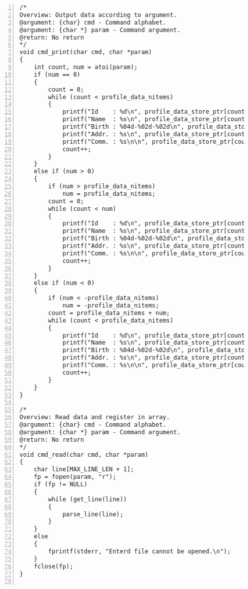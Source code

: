 \documentclass[autodetect-engine,dvi=dvipdfmx,ja=standard,
               a4j,11pt]{bxjsarticle}
\begin{document}
\begin{Verbatim}[numbers=left, xleftmargin=10mm, numbersep=6pt,
    fontsize=\small, baselinestretch=0.8]
/*
Overview: Output data according to argument.
@argument: {char} cmd - Command alphabet.
@argument: {char *} param - Command argument.
@return: No return
*/
void cmd_print(char cmd, char *param)
{
    int count, num = atoi(param);
    if (num == 0)
    {
        count = 0;
        while (count < profile_data_nitems)
        {
            printf("Id    : %d\n", profile_data_store_ptr[count]->id);
            printf("Name  : %s\n", profile_data_store_ptr[count]->name);
            printf("Birth : %04d-%02d-%02d\n", profile_data_store_ptr[count]->birthday.y, profile_data_store_ptr[count]->birthday.m, profile_data_store_ptr[count]->birthday.d);
            printf("Addr. : %s\n", profile_data_store_ptr[count]->address);
            printf("Comm. : %s\n\n", profile_data_store_ptr[count]->note);
            count++;
        }
    }
    else if (num > 0)
    {
        if (num > profile_data_nitems)
            num = profile_data_nitems;
        count = 0;
        while (count < num)
        {
            printf("Id    : %d\n", profile_data_store_ptr[count]->id);
            printf("Name  : %s\n", profile_data_store_ptr[count]->name);
            printf("Birth : %04d-%02d-%02d\n", profile_data_store_ptr[count]->birthday.y, profile_data_store_ptr[count]->birthday.m, profile_data_store_ptr[count]->birthday.d);
            printf("Addr. : %s\n", profile_data_store_ptr[count]->address);
            printf("Comm. : %s\n\n", profile_data_store_ptr[count]->note);
            count++;
        }
    }
    else if (num < 0)
    {
        if (num < -profile_data_nitems)
            num = -profile_data_nitems;
        count = profile_data_nitems + num;
        while (count < profile_data_nitems)
        {
            printf("Id    : %d\n", profile_data_store_ptr[count]->id);
            printf("Name  : %s\n", profile_data_store_ptr[count]->name);
            printf("Birth : %04d-%02d-%02d\n", profile_data_store_ptr[count]->birthday.y, profile_data_store_ptr[count]->birthday.m, profile_data_store_ptr[count]->birthday.d);
            printf("Addr. : %s\n", profile_data_store_ptr[count]->address);
            printf("Comm. : %s\n\n", profile_data_store_ptr[count]->note);
            count++;
        }
    }
}

/*
Overview: Read data and register in array.
@argument: {char} cmd - Command alphabet.
@argument: {char *} param - Command argument.
@return: No return
*/
void cmd_read(char cmd, char *param)
{
    char line[MAX_LINE_LEN + 1];
    fp = fopen(param, "r");
    if (fp != NULL)
    {
        while (get_line(line))
        {
            parse_line(line);
        }
    }
    else
    {
        fprintf(stderr, "Enterd file cannot be opened.\n");
    }
    fclose(fp);
}


\end{Verbatim}
\end{document}
